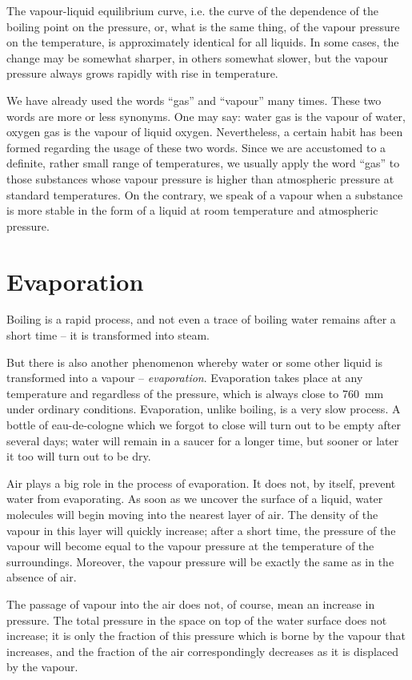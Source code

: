The vapour-liquid equilibrium curve, i.e. the curve of the dependence of the boiling point on the pressure, or, what is the same thing, of the vapour pressure on the temperature, is approximately identical for all liquids. In some cases, the change may be somewhat sharper, in others somewhat slower, but the vapour pressure always grows rapidly with rise in temperature.

We have already used the words ``gas'' and ``vapour'' many times. These two words are more or less synonyms. One may say: water gas is the vapour of water, oxygen gas is the vapour of liquid oxygen. Nevertheless, a certain habit has been formed regarding the usage of these two words. Since we are accustomed to a definite, rather small range of temperatures, we usually apply the word ``gas'' to those substances whose vapour pressure is higher than atmospheric pressure at standard temperatures. On the contrary, we speak of a vapour when a substance is more stable in the form of a liquid at room temperature and atmospheric pressure.

\section{Evaporation}

Boiling is a rapid process, and not even a trace of boil­ing water remains after a short time -- it is transformed into steam.

But there is also another phenomenon whereby water or some other liquid is transformed into a vapour -- \emph{evap­oration}. Evaporation takes place at any temperature and regardless of the pressure, which is always close to \SI{760}{\milli\meter\mercury} under ordinary conditions. Evaporation, unlike boiling, is a very slow process. A bottle of eau-de-cologne which we forgot to close will turn out to be empty after several days; water will remain in a saucer for a longer time, but sooner or later it too will turn out to be dry.

Air plays a big role in the process of evaporation. It does not, by itself, prevent water from evaporating. As soon as we uncover the surface of a liquid, water mole­cules will begin moving into the nearest layer of air. The density of the vapour in this layer will quickly increase; after a short time, the pressure of the vapour will become equal to the vapour pressure at the temperature of the surroundings. Moreover, the vapour pressure will be exactly the same as in the absence of air.

The passage of vapour into the air does not, of course, mean an increase in pressure. The total pressure in the space on top of the water surface does not increase; it is only the fraction of this pressure which is borne by the vapour that increases, and the fraction of the air corre­spondingly decreases as it is displaced by the vapour.

